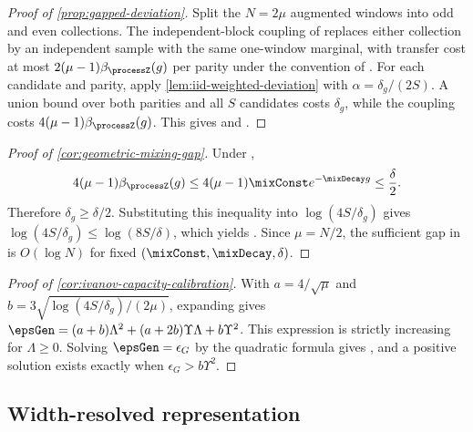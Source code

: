 \begin{proof}[Proof of \cref{prop:gapped-deviation}]
Split the $N=2\mu$ augmented windows into odd and even collections.  The
independent-block coupling of \citet{Yu1994} replaces either collection by an
independent sample with the same one-window marginal, with transfer cost at
most $2(\mu-1)\beta_{\processZ}(g)$ per parity under the convention of
\citet{MohriRostamizadeh2008}.  For each candidate and parity, apply
\cref{lem:iid-weighted-deviation} with $\alpha=\delta_g/(2S)$.  A union bound
over both parities and all $S$ candidates costs $\delta_g$, while the coupling
costs $4(\mu-1)\beta_{\processZ}(g)$.  This gives
 and .
\end{proof}

\begin{proof}[Proof of \cref{cor:geometric-mixing-gap}]
Under ,
\[
    4(\mu-1)\beta_{\processZ}(g)
    \leq4(\mu-1)\mixConst e^{-\mixDecay g}
    \leq\frac{\delta}{2}.
\]
Therefore $\delta_g\geq\delta/2$.  Substituting this inequality into
$\log(4S/\delta_g)$ gives
$\log(4S/\delta_g)\leq\log(8S/\delta)$, which yields
.  Since $\mu=N/2$, the sufficient
gap in  is $O(\log N)$ for fixed
$(\mixConst,\mixDecay,\delta)$.
\end{proof}

\begin{proof}[Proof of \cref{cor:ivanov-capacity-calibration}]
With $a=4/\sqrt\mu$ and
$b=3\sqrt{\log(4S/\delta_g)/(2\mu)}$, expanding
 gives
$\epsGen=(a+b)\Lambda^2+(a+2b)\Upsilon\Lambda+b\Upsilon^2$.  This expression
is strictly increasing for $\Lambda\geq0$.  Solving
$\epsGen=\epsilon_G$ by the quadratic formula gives
, and a positive solution exists exactly when
$\epsilon_G>b\Upsilon^2$.
\end{proof}

\subsection{Width-resolved representation}

